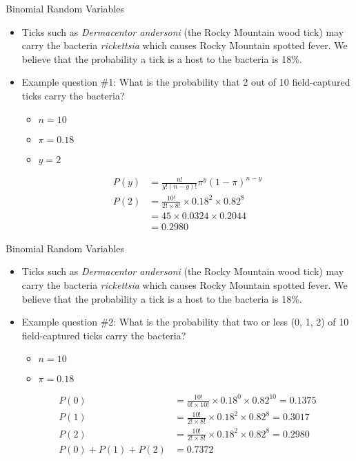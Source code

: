 \documentclass[xcolor=dvipsnames]{beamer}
\begin{document}
\begin{frame}{Binomial Random Variables}
	\begin{itemize}
		\item Ticks such as \emph{Dermacentor andersoni} (the Rocky Mountain wood tick) may carry the bacteria \emph{rickettsia} which causes Rocky Mountain spotted fever. We believe that the probability a tick is a host to the bacteria is 18\%. 
		\item Example question \#1: What is the probability that 2 out of 10 field-captured ticks carry the bacteria?
		\begin{itemize}
			\item $n = 10$
			\item $\pi = 0.18$
			\item $y = 2$
		\end{itemize}
		\begin{align*}
			P(y) &= \frac{n!}{y!(n-y)!} \pi^y (1-\pi)^{n-y} \\
			P(2) &= \frac{10!}{2! \times 8!} \times 0.18^{2} \times 0.82^{8} \\
			&= 45 \times 0.0324 \times 0.2044 \\
			&= 0.2980
 		\end{align*}
	\end{itemize}
\end{frame}

\begin{frame}{Binomial Random Variables}
	\begin{itemize}
		\item Ticks such as \emph{Dermacentor andersoni} (the Rocky Mountain wood tick) may carry the bacteria \emph{rickettsia} which causes Rocky Mountain spotted fever. We believe that the probability a tick is a host to the bacteria is 18\%. 
		\item Example question \#2: What is the probability that two or less (0, 1, 2) of 10 field-captured ticks carry the bacteria?
		\begin{itemize}
			\item $n = 10$
			\item $\pi = 0.18$
		\end{itemize}
		\begin{align*}
		P(0) &= \frac{10!}{0! \times 10!} \times 0.18^{0} \times 0.82^{10} = 0.1375 \\
		P(1) &= \frac{10!}{2! \times 8!} \times 0.18^{2} \times 0.82^{8} = 0.3017 \\
		P(2) &= \frac{10!}{2! \times 8!} \times 0.18^{2} \times 0.82^{8} = 0.2980\\
		P(0) + P(1) + P(2) &= 0.7372
		\end{align*}
	\end{itemize}
\end{frame}
\end{document}
